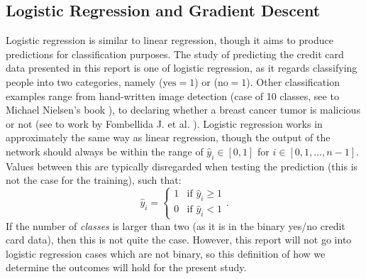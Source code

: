     \subsection{Logistic Regression and Gradient Descent}
        Logistic regression is similar to linear regression, though it aims to produce predictions for classification purposes. The study of predicting the credit card data presented in this report is one of logistic regression, as it regards classifying people into two categories, namely ($\text{yes}=1$) or ($\text{no}=1$). Other classification examples range from hand-written image detection (case of 10 classes, see to Michael Nielsen's book \cite{nielsenneural}), to declaring whether a breast cancer tumor is malicious or not (see to work by Fombellida J. et al. \cite{breastcancer}). Logistic regression works in approximately the same way as linear regression, though the output of the network should always be within the range of $\hat{y}_i\in [0,1]$ for $i \in [0,1,\hdots,n-1]$. Values between this are typically disregarded when testing the prediction (this is not the case for the training), such that:
        \begin{equation}
            \hat{y}_i = \begin{cases} 1 & \text{if } \hat{y}_i\geq 1 \\ 0 & \text{if } \hat{y}_i < 1 \end{cases}.
        \end{equation}
        If the number of \textit{classes} is larger than two (as it is in the binary yes/no credit card data), then this is not quite the case. However, this report will not go into logistic regression cases which are not binary, so this definition of how we determine the outcomes will hold for the present study.
